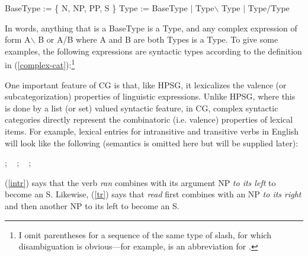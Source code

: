 \documentclass[output=paper]{langsci/langscibook}
\begin{document}
\begin{exe}
 \ex\label{cat-def}
  \begin{xlist}
 \ex\label{bascat}
    BaseType := \{ N,  NP, PP, S \}
 \ex\label{complex-cat}
    Type := BaseType $|$ Type\ensuremath{\backslash} Type $|$ Type/Type
  \end{xlist}
\end{exe}
In words, anything that is a BaseType is a Type, and
any complex expression of form A\ensuremath{\backslash} B  or A/B where A and B are both
Types is a Type. To give some examples, the following expressions are
syntactic types according to the definition in
(\ref{complex-cat}):\footnote{I omit
parentheses for a sequence of the same type of slash, for which
disambiguation is obvious---for example,  is an abbreviation for .}

\begin{exe}
 \ex\label{}
  \begin{xlist}
 \ex\label{}
 \ex\label{}
 \ex\label{}
 \ex\label{}
  \end{xlist}
\end{exe}

One important feature of CG is that, like HPSG, it lexicalizes the
valence (or subcategorization) properties of linguistic expressions.
Unlike HPSG, where this is done by a list (or set) valued syntactic
feature, in CG, complex syntactic categories directly represent the
combinatoric (i.e. valence) properties of lexical items. For example,
lexical entries for intransitive and transitive verbs in English will
look like the following (semantics is omitted here but will be
supplied later):

\begin{exe}
 \ex\label{lex1}
  \begin{xlist}
 \ex\label{intr}
    ; \  
 \ex\label{tr}
    ; \ 
 \ex\label{tr}
    ; \ 
  \end{xlist}
\end{exe}
(\ref{intr}) says that the verb \textit{ran} combines with its argument NP \emph{to its
left} to become an S. Likewise, (\ref{tr}) says that \textit{read} first
combines with an NP \emph{to its right} and then another NP to its left to
become an S.
\end{document}

